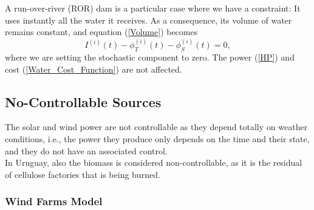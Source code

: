 A run-over-river (ROR) dam is a particular case where we have a constraint: It uses instantly all the water it receives. As a consequence, its volume of water remains constant, and equation (\ref{Volume}) becomes
\begin{equation}
I^{(i)}(t)-\phi_T^{(i)}(t)-\phi_S^{(i)}(t)=0,
\label{ROR_Condition}
\end{equation}
where we are setting the stochastic component to zero. The power (\ref{HP}) and cost (\ref{Water_Cost_Function}) are not affected.

\subsection{No-Controllable Sources} \label{Subsection_NoControllable}

The solar and wind power are not controllable as they depend totally on weather conditions, i.e., the power they produce only depends on the time and their state, and they do not have an associated control.\\
In Uruguay, also the biomass is considered non-controllable, as it is the residual of cellulose factories that is being burned.

\subsubsection{Wind Farms Model}\label{Wind_Model}

